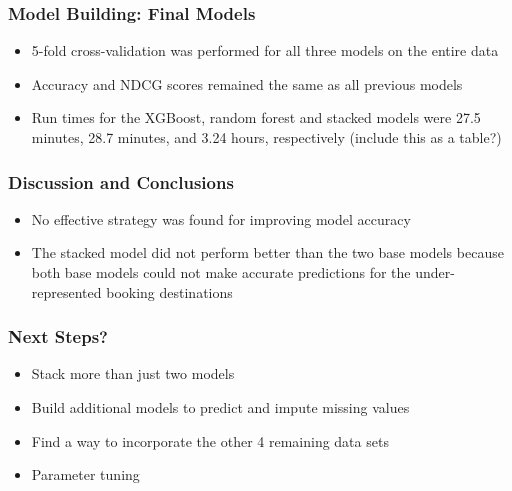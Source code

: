 \documentclass{beamer}
\begin{document}
\begin{frame}
\frametitle{Model Building: Final Models}
\begin{itemize}
  \item 5-fold cross-validation was performed for all three models on the entire data 
  \item Accuracy and NDCG scores remained the same as all previous models 
  \item Run times for the XGBoost, random forest and stacked models were 27.5 minutes, 28.7 minutes, and 3.24 hours, respectively (include this as a table?) 
\end{itemize}
\end{frame}


\begin{frame}
\frametitle{Discussion and Conclusions}
\begin{itemize}
  \item No effective strategy was found for improving model accuracy
  \item The stacked model did not perform better than the two base models because both base models could not make accurate predictions for the under-represented booking destinations 
\end{itemize}
\end{frame}

\begin{frame}
\frametitle{Next Steps?}
\begin{itemize}
  \item Stack more than just two models
  \item Build additional models to predict and impute missing values 
  \item Find a way to incorporate the other 4 remaining data sets 
  \item Parameter tuning 
\end{itemize}
\end{frame}

 
\end{document}
